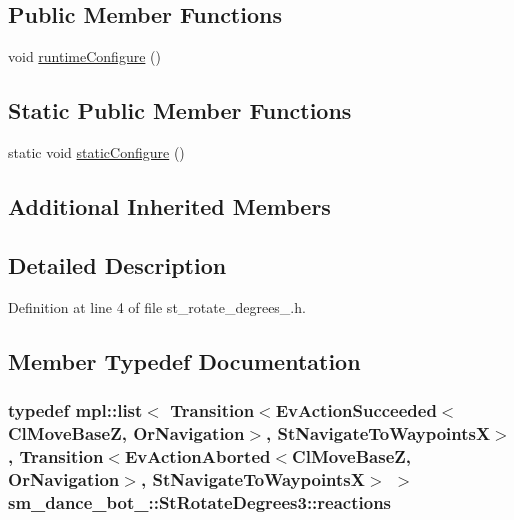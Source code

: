 \subsection*{Public Member Functions}
\begin{DoxyCompactItemize}
\item 
void \hyperlink{structsm__dance__bot__3_1_1StRotateDegrees3_a6a7790011b8214f6afb5457590d50e6c}{runtime\+Configure} ()
\end{DoxyCompactItemize}
\subsection*{Static Public Member Functions}
\begin{DoxyCompactItemize}
\item 
static void \hyperlink{structsm__dance__bot__3_1_1StRotateDegrees3_ab4988e1bb1a9fe60db3cff811413107e}{static\+Configure} ()
\end{DoxyCompactItemize}
\subsection*{Additional Inherited Members}


\subsection{Detailed Description}


Definition at line 4 of file st\+\_\+rotate\+\_\+degrees\+\_.\+h.



\subsection{Member Typedef Documentation}
\subsubsection[{\texorpdfstring{reactions}{reactions}}]{\setlength{\rightskip}{0pt plus 5cm}typedef mpl\+::list$<$ Transition$<$Ev\+Action\+Succeeded$<${\bf Cl\+Move\+BaseZ}, {\bf Or\+Navigation}$>$, {\bf St\+Navigate\+To\+WaypointsX}$>$, Transition$<$Ev\+Action\+Aborted$<${\bf Cl\+Move\+BaseZ}, {\bf Or\+Navigation}$>$, {\bf St\+Navigate\+To\+WaypointsX}$>$ $>$ {\bf sm\+\_\+dance\+\_\+bot\+\_\+::\+St\+Rotate\+Degrees3\+::reactions}}\hypertarget{structsm__dance__bot__3_1_1StRotateDegrees3_a4aa78aeefcd35680008136a2b29df986}{}\label{structsm__dance__bot__3_1_1StRotateDegrees3_a4aa78aeefcd35680008136a2b29df986}


